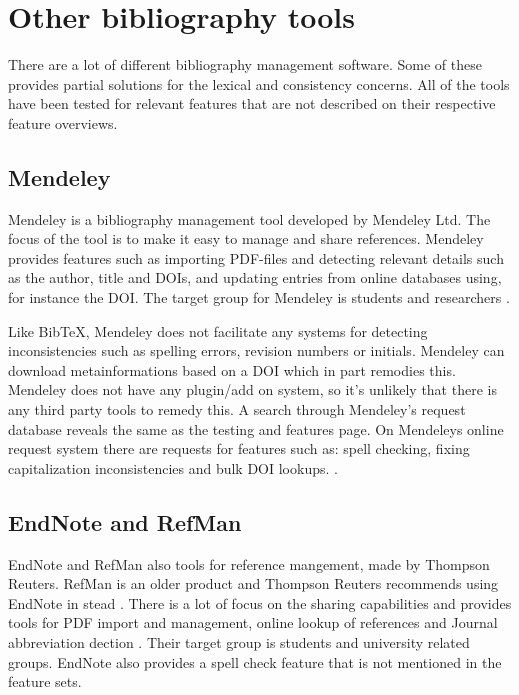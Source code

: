 \section{Other bibliography tools}
There are a lot of different bibliography management software.  Some
of these provides partial solutions for the lexical and consistency
concerns.  All of the tools have been tested for relevant features
that are not described on their respective feature overviews.

\subsection{Mendeley}
Mendeley is a bibliography management tool developed by Mendeley Ltd.
The focus of the tool is to make it easy to manage and share
references.  Mendeley provides features such as importing PDF-files
and detecting relevant details such as the author, title and DOIs, and
updating entries from online databases using, for instance the DOI.
The target group for Mendeley is students and researchers
\cite{mendeley_features}.

Like BibTeX, Mendeley does not facilitate any systems for detecting
inconsistencies such as spelling errors, revision numbers or initials.
Mendeley can download metainformations based on a DOI which in part
remodies this.  Mendeley does not have any plugin/add on system, so
it's unlikely that there is any third party tools to remedy this. A
search through Mendeley's request database reveals the same as the
testing and features page.  On Mendeleys online request system there
are requests for features such as: spell checking, fixing
capitalization inconsistencies and bulk DOI lookups.
\cite{mendeley_request_spellcheck, mendeley_request_lowercase,
  mendeley_request_capitalization, mendeley_request_bulk_doi}.

\subsection{EndNote and RefMan}
EndNote and RefMan also tools for reference mangement, made by
Thompson Reuters.  RefMan is an older product and Thompson Reuters
recommends using EndNote in stead \cite{refman_switch,
  refman_features}.  There is a lot of focus on the sharing
capabilities and provides tools for PDF import and management, online
lookup of references and Journal abbreviation dection
\cite{endnote_basic_features, endnote_x7_features}.  Their target
group is students and university related groups.  EndNote also
provides a spell check feature that is not mentioned in the feature
sets\cite{endnote_spellcheck}.

